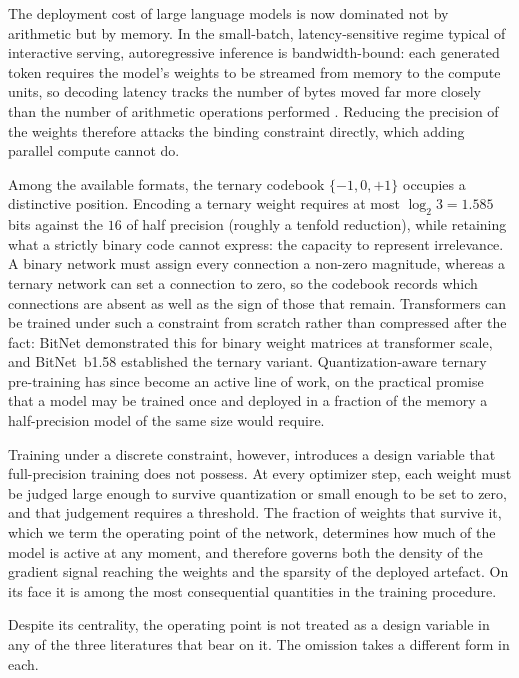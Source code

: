\documentclass[final,5p,times,twocolumn]{elsarticle}
\theoremstyle{remark}
\begin{document}
The deployment cost of large language models is now dominated not by
arithmetic but by memory. In the small-batch, latency-sensitive regime typical
of interactive serving, autoregressive inference is bandwidth-bound: each
generated token requires the model's weights to be streamed from memory to the
compute units, so decoding latency tracks the number of bytes moved far more
closely than the number of arithmetic operations performed
\cite{shazeer2019, pope2023}. Reducing the precision of the weights therefore
attacks the binding constraint directly, which adding parallel compute cannot
do.

Among the available formats, the ternary codebook $\{-1, 0, +1\}$ occupies a
distinctive position. Encoding a ternary weight requires at most
$\log_{2} 3 = 1.585$ bits against the $16$ of half precision (roughly a
tenfold reduction), while retaining what a strictly binary code cannot
express: the capacity to represent irrelevance. A binary network must assign
every connection a non-zero magnitude, whereas a ternary network can set a
connection to zero, so the codebook records which connections are absent as
well as the sign of those that remain. Transformers can be trained under such
a constraint from scratch rather than compressed after the fact: BitNet
\cite{wang2023} demonstrated this for binary weight matrices at transformer
scale, and BitNet~b1.58 \cite{ma2024} established the ternary variant.
Quantization-aware ternary pre-training has since become an active line of
work, on the practical promise that a model may be trained once and deployed
in a fraction of the memory a half-precision model of the same size would
require.

Training under a discrete constraint, however, introduces a design variable
that full-precision training does not possess. At every optimizer step, each
weight must be judged large enough to survive quantization or small enough to
be set to zero, and that judgement requires a threshold. The fraction of
weights that survive it, which we term the operating point of the
network, determines how much of the model is active at any moment, and
therefore governs both the density of the gradient signal reaching the weights
and the sparsity of the deployed artefact. On its face it is among the most consequential
quantities in the training procedure.

Despite its centrality, the operating point is not treated as a design variable
in any of the three literatures that bear on it. The omission takes a different
form in each.
\end{document}
